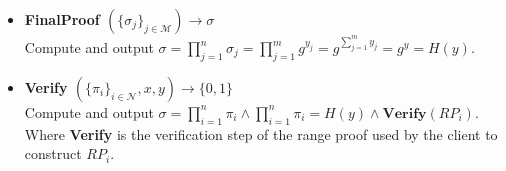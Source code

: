 \begin{algorithm}
\begin{itemize}
\item\textbf{FinalProof $(\{\sigma_j\}_{j\in\mathcal{M}})\xrightarrow[]{}\sigma$}\\
Compute and output $\sigma = \prod_{j=1}^n \sigma_j = \prod_{j=1}^m g^{y_{j}} =  g^{\sum_{j=1}^m y_{j}}= g^{y}=H(y)$.

\item\textbf{Verify $(\{\pi_i\}_{i\in\mathcal{N}},x,y)\xrightarrow[]{}\{0,1\}$}\\
Compute and output $\sigma= \prod_{i=1}^n \pi_i \wedge \prod_{i=1}^n \pi_i = H(y)\wedge \textbf{Verify}(RP_i)$. Where \textbf{Verify} is the verification step of the range proof used by the client to construct $RP_i$.
\end{itemize}
\label{alg:VAHSS-HSS-RP}
\end{algorithm}

